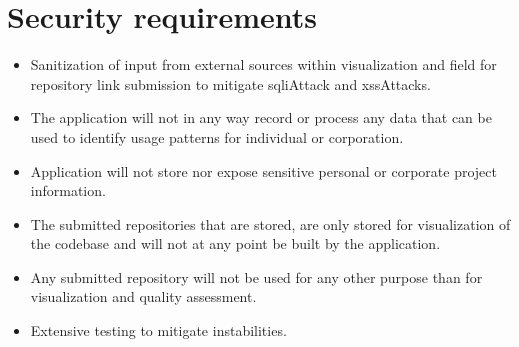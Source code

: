 \section{Security requirements}
\begin{itemize}
    \item Sanitization of input from external sources within visualization and field for repository link submission to mitigate \gls{sqliAttack} and \gls{xssAttack}s.
    \item The application will not in any way record or process any data that can be used to identify usage patterns for individual or corporation. 
    \item Application will not store nor expose sensitive personal or corporate project information.
    \item The submitted repositories that are stored, are only stored for visualization of the codebase and will not at any point be built by the application.
    \item Any submitted repository will not be used for any other purpose than for visualization and quality assessment.
    \item Extensive testing to mitigate instabilities.
\end{itemize}